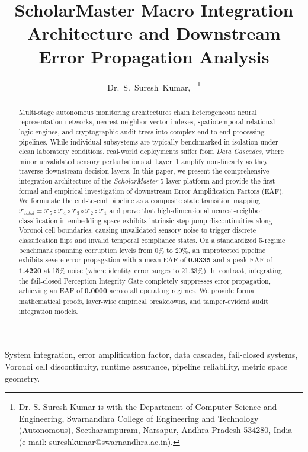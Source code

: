 \documentclass[10pt,journal,compsoc]{IEEEtran}
\title{ScholarMaster Macro Integration Architecture and Downstream Error Propagation Analysis}
\author{Dr.~S.~Suresh~Kumar\IEEEauthorrefmark{1},~\IEEEmembership{Senior Member,~IEEE}
\thanks{\IEEEauthorrefmark{1}Dr. S. Suresh Kumar is with the Department of Computer Science and Engineering, Swarnandhra College of Engineering and Technology (Autonomous), Seetharampuram, Narsapur, Andhra Pradesh 534280, India (e-mail: sureshkumar@swarnandhra.ac.in).}}
\begin{document}
\maketitle

\begin{abstract}
Multi-stage autonomous monitoring architectures chain heterogeneous neural representation networks, nearest-neighbor vector indexes, spatiotemporal relational logic engines, and cryptographic audit trees into complex end-to-end processing pipelines. While individual subsystems are typically benchmarked in isolation under clean laboratory conditions, real-world deployments suffer from \textit{Data Cascades}, where minor unvalidated sensory perturbations at Layer~1 amplify non-linearly as they traverse downstream decision layers. In this paper, we present the comprehensive integration architecture of the \textit{ScholarMaster} 5-layer platform and provide the first formal and empirical investigation of downstream Error Amplification Factors (EAF). We formulate the end-to-end pipeline as a composite state transition mapping $\mathcal{T}_{total} = \mathcal{T}_5 \circ \mathcal{T}_4 \circ \mathcal{T}_3 \circ \mathcal{T}_2 \circ \mathcal{T}_1$ and prove that high-dimensional nearest-neighbor classification in embedding space exhibits intrinsic step jump discontinuities along Voronoi cell boundaries, causing unvalidated sensory noise to trigger discrete classification flips and invalid temporal compliance states. On a standardized 5-regime benchmark spanning corruption levels from 0\% to 20\%, an unprotected pipeline exhibits severe error propagation with a mean EAF of \textbf{0.9335} and a peak EAF of \textbf{1.4220} at 15\% noise (where identity error surges to 21.33\%). In contrast, integrating the fail-closed Perception Integrity Gate completely suppresses error propagation, achieving an EAF of \textbf{0.0000} across all operating regimes. We provide formal mathematical proofs, layer-wise empirical breakdowns, and tamper-evident audit integration models.
\end{abstract}

\begin{IEEEkeywords}
System integration, error amplification factor, data cascades, fail-closed systems, Voronoi cell discontinuity, runtime assurance, pipeline reliability, metric space geometry.
\end{IEEEkeywords}
\end{document}
